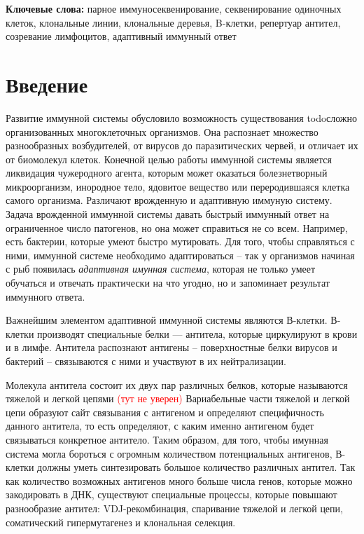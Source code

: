 \documentclass{spbau-diploma}
\newcommand{\todo}{\textcolor{red}}
\begin{document}
\textbf{Ключевые слова:} парное иммуносеквенирование, секвенирование одиночных клеток, клональные линии, клональные деревья, B-клетки, репертуар антител, созревание лимфоцитов, адаптивный иммунный ответ


\section{Введение}

Развитие иммунной системы обусловило возможность существования todo{сложно организованных многоклеточных организмов}.
Она распознает множество разнообразных возбудителей, от вирусов до паразитических червей, и отличает их от биомолекул клеток.
Конечной целью работы иммунной системы является ликвидация чужеродного агента, которым может оказаться болезнетворный микроорганизм, инородное тело, ядовитое вещество или переродившаяся клетка самого организма.
Различают врожденную и адаптивную иммуную систему.
Задача врожденной иммунной системы давать быстрый иммунный ответ на ограниченное число патогенов, но она может справиться не со всем.
Например, есть бактерии, которые умеют быстро мутировать. Для того, чтобы справляться с ними, иммунной системе необходимо адаптироваться -- так у организмов начиная с рыб появилась \textit{адаптивная имунная система}, которая не только
умеет обучаться и отвечать практически на что угодно, но и запоминает результат иммунного ответа.


Важнейшим элементом адаптивной иммунной системы являются В-клетки.
В-клетки производят специальные белки ---  антитела, которые циркулируют в крови и в лимфе.
Антитела распознают антигены -- поверхностные белки вирусов и бактерий -- связываются с ними и участвуют в их нейтрализации.


Молекула антитела состоит их двух пар различных белков, которые называются тяжелой и легкой цепями   \todo{(тут не уверен)}
Вариабельные части тяжелой и легкой цепи образуют сайт связывания с антигеном и определяют специфичность данного антитела, то есть определяют, с каким именно антигеном будет связываться конкретное антитело.
Таким образом, для того, чтобы имунная система могла бороться с огромным количеством потенциальных антигенов, В-клетки должны уметь синтезировать большое количество различных антител.
Так как количество возможных антигенов много больше числа генов, которые можно закодировать в ДНК, существуют специальные процессы, которые повышают разнообразие антител: VDJ-рекомбинация, спаривание тяжелой и легкой цепи, соматический гипермутагенез и клональная селекция.
\end{document}
